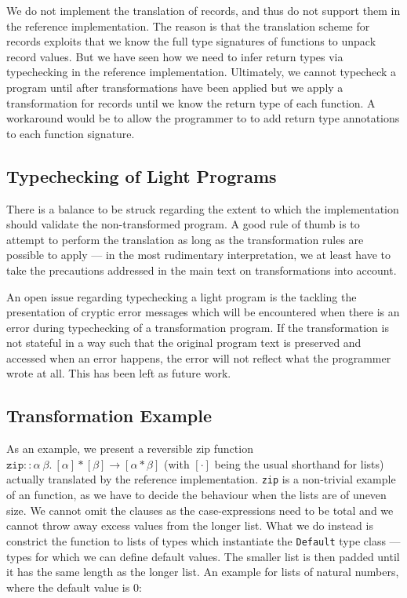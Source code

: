 We do not implement the translation of records, and thus do not support them in
the reference implementation. The reason is that the translation scheme for
records exploits that we know the full type signatures of functions to unpack
record values. But we have seen how we need to infer return types via
typechecking in the reference implementation. Ultimately, we cannot typecheck a
program until after transformations have been applied but we apply a
transformation for records until we know the return type of each function. A
workaround would be to allow the programmer to to add return type annotations
to each function signature.

\subsection{Typechecking of Light Programs}

There is a balance to be struck regarding the extent to which the
implementation should validate the non-transformed program. A good rule of
thumb is to attempt to perform the translation as long as the transformation
rules are possible to apply --- in the most rudimentary interpretation, we at
least have to take the precautions addressed in the main text on
transformations into account.

An open issue regarding typechecking a light program is the tackling the
presentation of cryptic error messages which will be encountered when there is
an error during typechecking of a transformation program. If the transformation
is not stateful in a way such that the original program text is preserved and
accessed when an error happens, the error will not reflect what the programmer
wrote at all. This has been left as future work.

\subsection{Transformation Example}

As an example, we present a reversible zip function $\texttt{zip} ::
\alpha~\beta .~[\alpha] * [\beta] \rightarrow [\alpha * \beta]$ (with $[\cdot]$
being the usual shorthand for lists) actually translated by the reference
implementation. \texttt{zip} is a non-trivial example of an \rfunc function, as
we have to decide the behaviour when the lists are of uneven size. We cannot
omit the clauses as the case-expressions need to be total and we cannot throw
away excess values from the longer list. What we do instead is constrict the
function to lists of types which instantiate the \texttt{Default} type class
--- types for which we can define default values. The smaller list is then
padded until it has the same length as the longer list. An example for lists of
natural numbers, where the default value is 0:

